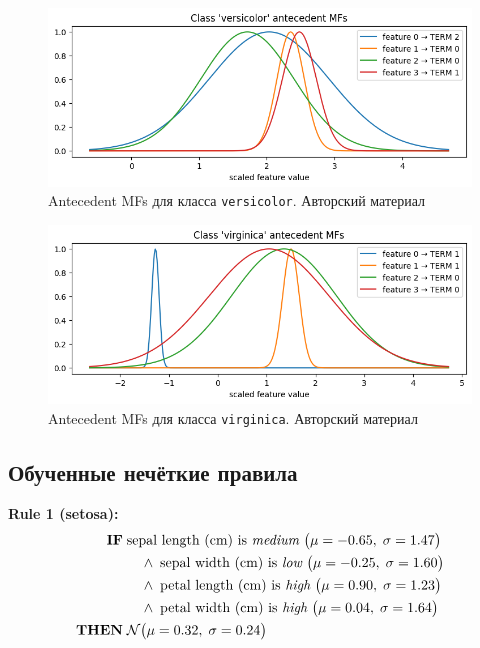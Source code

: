 \begin{figure}[H]
  \centering
  \includegraphics[width=0.9\linewidth]{images/mf_in_versicolor.png}
  \caption{Antecedent MFs для класса \texttt{versicolor}. Авторский материал}
  \label{fig:mf_in_versicolor}
\end{figure}

\begin{figure}[H]
  \centering
  \includegraphics[width=0.9\linewidth]{images/mf_in_virginica.png}
  \caption{Antecedent MFs для класса \texttt{virginica}. Авторский материал}
  \label{fig:mf_in_virginica}
\end{figure}

\subsection*{Обученные нечёткие правила}

\noindent\textbf{Rule 1 (setosa):}  
\begin{align*}
  \textbf{IF}\;&\text{sepal length (cm) is \emph{medium}}\;\bigl(\mu=-0.65,\;\sigma=1.47\bigr)\\
                &\quad\land\;\text{sepal width  (cm) is \emph{low}}   \;\bigl(\mu=-0.25,\;\sigma=1.60\bigr)\\
                &\quad\land\;\text{petal length (cm) is \emph{high}}  \;\bigl(\mu=0.90,\;\sigma=1.23\bigr)\\
                &\quad\land\;\text{petal width  (cm) is \emph{high}}  \;\bigl(\mu=0.04,\;\sigma=1.64\bigr)\\
  \textbf{THEN}\;&\mathcal{N}\bigl(\mu=0.32,\;\sigma=0.24\bigr)
\end{align*}

